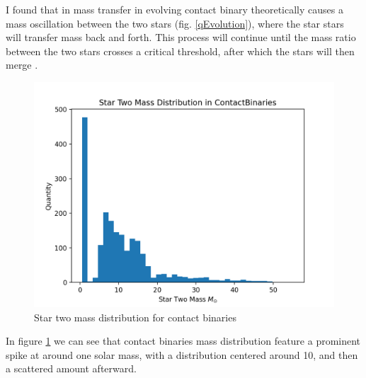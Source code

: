 \documentclass[12pt, a4paper]{article}
\begin{document}
            I found that in mass transfer in evolving contact binary theoretically causes a mass oscillation between the two stars \cite{Fabry_2025} (fig. \ref{qEvolution}), where the star stars will transfer mass back and forth. This process will continue until the mass ratio between the two stars crosses a critical threshold, after which the stars will then merge \cite{Fabry_2025}. 

        \begin{figure}[H]
            \centering
            \includegraphics[scale = .4]{figs/GeneratedFigs/W_UMa/ContactBinaries_Star_Two_Mass_Distribution.png}
            \caption{Star two mass distribution for contact binaries}
            \label{contactBinaryStar2MassDistro}
        \end{figure}

        In figure \ref{contactBinaryStar2MassDistro} we can see that contact binaries mass distribution feature a prominent spike at around one solar mass, with a distribution centered around 10, and then a scattered amount afterward. 
\end{document}
